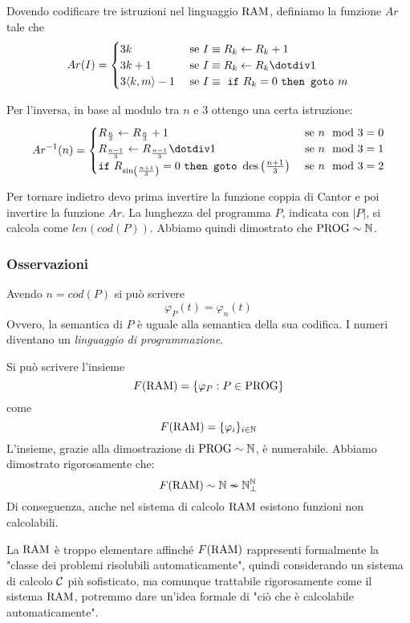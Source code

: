 Dovendo codificare tre istruzioni nel linguaggio $\text{RAM}$, definiamo la funzione $Ar$ tale che
$$ 
Ar(I) = \begin{cases}
	3k & \text{ se } I \equiv R_k \leftarrow R_k + 1 \\
	3k + 1 & \text{ se } I \equiv R_k \leftarrow R_k \dotminus 1 \\
	3 \langle k,m\rangle - 1 & \text{ se } I \equiv \text{ \texttt{if} } R_k = 0 \text{ \texttt{then goto} } m \\
\end{cases}
$$

Per l'inversa, in base al modulo tra $n$ e 3 ottengo una certa istruzione: 
$$
Ar^{-1} (n) = \begin{cases}
	R_{\frac{n}{3}} \leftarrow R_{\frac{n}{3}} + 1 & \text{ se } n \mod 3 = 0 \\
	R_{\frac{n-1}{3}} \leftarrow R_{\frac{n-1}{3}} \dotminus 1 & \text{ se } n \mod 3 = 1 \\
	\text{\texttt{if} } R_{\sin\left(\frac{n+1}{3}\right)} = 0 \text{ \texttt{then goto} } \des\left(\frac{n+1}{3}\right) & \text{ se } n \mod 3 = 2 \\
\end{cases}
$$

Per tornare indietro devo prima invertire la funzione coppia di Cantor e poi invertire la funzione $Ar$.
La lunghezza del programma $P$, indicata con $|P|$, si calcola come $len(cod(P))$. Abbiamo quindi dimostrato che $\text{PROG} \sim \mathbb{N}$.  %

\subsubsection{Osservazioni}
Avendo $n = cod(P)$ si può scrivere
$$ \varphi_P (t) = \varphi_n (t) $$
Ovvero, la semantica di $P$ è uguale alla semantica della sua codifica. I numeri diventano un \textit{linguaggio di programmazione}.

Si può scrivere l'insieme 
$$ F(\text{RAM}) = \{\varphi_P: P \in \text{PROG} \}$$
come 
$$ F(\text{RAM}) = \{\varphi_i\}_{i \in \mathbb{N}} $$
L'insieme, grazie alla dimostrazione di $\text{PROG} \sim \mathbb{N}$, è numerabile. Abbiamo dimostrato rigorosamente che:
$$ F(\text{RAM}) \sim \mathbb{N} \nsim \mathbb{N}^{\mathbb{N}}_\bot $$
Di conseguenza, anche nel sistema di calcolo $\text{RAM}$ esistono funzioni non calcolabili.

La $\text{RAM}$ è troppo elementare affinché $F(\text{RAM})$ rappresenti formalmente la "classe dei problemi risolubili automaticamente", quindi considerando un sistema di calcolo $\mathcal{C}$ più sofisticato, ma comunque trattabile rigorosamente come il sistema $\text{RAM}$, potremmo dare un'idea formale di "ciò che è calcolabile automaticamente". 

